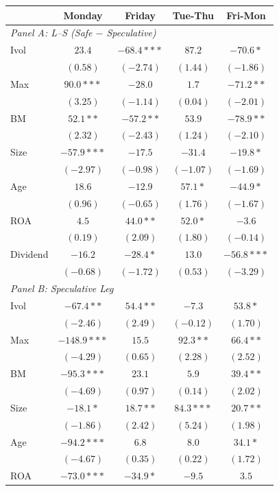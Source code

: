 \centering
\footnotesize
\begin{tabular}{l c c c c}
\toprule
 & Monday & Friday & Tue-Thu & Fri-Mon \\
\midrule
\multicolumn{5}{l}{\textit{Panel A: L--S (Safe $-$ Speculative)}} \\
Ivol & $23.4$ & $-68.4***$ & $87.2$ & $-70.6*$ \\
 & $(0.58)$ & $(-2.74)$ & $(1.44)$ & $(-1.86)$ \\
Max & $90.0***$ & $-28.0$ & $1.7$ & $-71.2**$ \\
 & $(3.25)$ & $(-1.14)$ & $(0.04)$ & $(-2.01)$ \\
BM & $52.1**$ & $-57.2**$ & $53.9$ & $-78.9**$ \\
 & $(2.32)$ & $(-2.43)$ & $(1.24)$ & $(-2.10)$ \\
Size & $-57.9***$ & $-17.5$ & $-31.4$ & $-19.8*$ \\
 & $(-2.97)$ & $(-0.98)$ & $(-1.07)$ & $(-1.69)$ \\
Age & $18.6$ & $-12.9$ & $57.1*$ & $-44.9*$ \\
 & $(0.96)$ & $(-0.65)$ & $(1.76)$ & $(-1.67)$ \\
ROA & $4.5$ & $44.0**$ & $52.0*$ & $-3.6$ \\
 & $(0.19)$ & $(2.09)$ & $(1.80)$ & $(-0.14)$ \\
Dividend & $-16.2$ & $-28.4*$ & $13.0$ & $-56.8***$ \\
 & $(-0.68)$ & $(-1.72)$ & $(0.53)$ & $(-3.29)$ \\
\midrule
\multicolumn{5}{l}{\textit{Panel B: Speculative Leg}} \\
Ivol & $-67.4**$ & $54.4**$ & $-7.3$ & $53.8*$ \\
 & $(-2.46)$ & $(2.49)$ & $(-0.12)$ & $(1.70)$ \\
Max & $-148.9***$ & $15.5$ & $92.3**$ & $66.4**$ \\
 & $(-4.29)$ & $(0.65)$ & $(2.28)$ & $(2.52)$ \\
BM & $-95.3***$ & $23.1$ & $5.9$ & $39.4**$ \\
 & $(-4.69)$ & $(0.97)$ & $(0.14)$ & $(2.02)$ \\
Size & $-18.1*$ & $18.7**$ & $84.3***$ & $20.7**$ \\
 & $(-1.86)$ & $(2.42)$ & $(5.24)$ & $(1.98)$ \\
Age & $-94.2***$ & $6.8$ & $8.0$ & $34.1*$ \\
 & $(-4.67)$ & $(0.35)$ & $(0.22)$ & $(1.72)$ \\
ROA & $-73.0***$ & $-34.9*$ & $-9.5$ & $3.5$ \\

\end{tabular}
